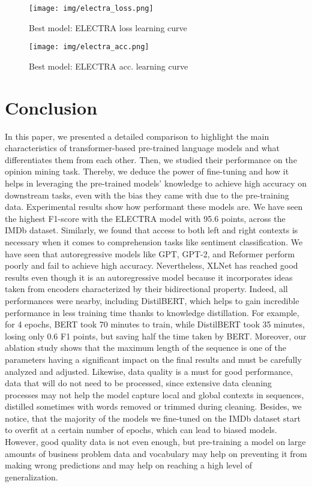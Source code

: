 \documentclass{article}
\begin{document}
\begin{figure}[ht]
	\centering
	\texttt{[image: img/electra\_loss.png]}
    \vspace{.5em}
    \caption{Best model: ELECTRA loss learning curve}
    \label{fig:lossbestmodel}
  \end{figure}

\begin{figure}[ht]
	\centering
	\texttt{[image: img/electra\_acc.png]}
        \vspace{.5em}
    \caption{Best model: ELECTRA acc. learning curve}
    \label{fig:accbestmodel}
\end{figure}


\section{Conclusion}
In this paper, we presented a detailed comparison to highlight the main characteristics of transformer-based pre-trained language models and what differentiates them from each other. Then, we studied their performance on the opinion mining task. Thereby,  we deduce the power of fine-tuning and how it helps in leveraging the pre-trained models' knowledge to achieve high accuracy on downstream tasks, even with the bias they came with due to the pre-training data. Experimental results show how performant these models are. We have seen the highest F1-score with the ELECTRA model with 95.6 points, across the IMDb dataset. Similarly, we found that access to both left and right contexts is necessary when it comes to comprehension tasks like sentiment classification. We have seen that autoregressive models like GPT, GPT-2, and Reformer perform poorly and fail to achieve high accuracy. Nevertheless, XLNet has reached good results even though it is an autoregressive model because it incorporates ideas taken from encoders characterized by their bidirectional property. Indeed, all performances were nearby, including DistilBERT, which helps to gain incredible performance in less training time thanks to knowledge distillation. For example, for 4 epochs, BERT took 70 minutes to train, while DistilBERT took 35 minutes, losing only 0.6 F1 points, but saving half the time taken by BERT. Moreover, our ablation study shows that the maximum length of the sequence is one of the parameters having a significant impact on the final results and must be carefully analyzed and adjusted. Likewise, data quality is a must for good performance, data that will do not need to be processed, since extensive data cleaning processes may not help the model capture local and global contexts in sequences, distilled sometimes with words removed or trimmed during cleaning. Besides, we notice, that the majority of the models we fine-tuned on the IMDb dataset start to overfit at a certain number of epochs, which can lead to biased models. However, good quality data is not even enough, but pre-training a model on large amounts of business problem data and vocabulary may help on preventing it from making wrong predictions and may help on reaching a high level of generalization.
\end{document}
